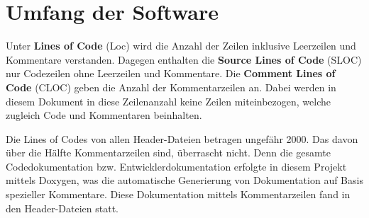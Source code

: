 \documentclass[../review_3.tex]{subfiles}
\begin{document}
\section{Umfang der Software}

Unter \textbf{Lines of Code} (Loc) wird die Anzahl der Zeilen inklusive Leerzeilen und Kommentare verstanden. Dagegen enthalten die \textbf{Source Lines of Code} (SLOC) nur Codezeilen ohne Leerzeilen und Kommentare. Die \textbf{Comment Lines of Code} (CLOC) geben die Anzahl der Kommentarzeilen an. Dabei werden in diesem Dokument in diese Zeilenanzahl keine Zeilen miteinbezogen, welche zugleich Code und Kommentaren beinhalten.

Die Lines of Codes von allen Header-Dateien betragen ungefähr 2000. Das davon über die Hälfte Kommentarzeilen sind, überrascht nicht. Denn die gesamte Codedokumentation bzw. Entwicklerdokumentation erfolgte in diesem Projekt mittels Doxygen, was die automatische Generierung von Dokumentation auf Basis spezieller Kommentare. Diese Dokumentation mittels Kommentarzeilen fand in den Header-Dateien statt.
\end{document}
